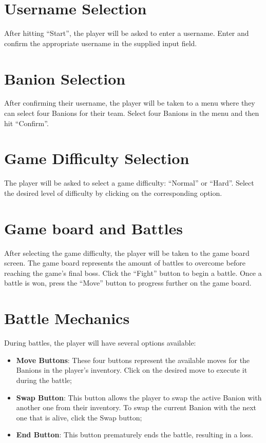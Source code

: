 \documentclass[12pt, a4paper]{report}
\theoremstyle{definition}
\begin{document}
\section{Username Selection}
After hitting ``Start'', the player will be asked to enter a username. Enter and confirm the appropriate username in the supplied input field.

\section{Banion Selection}
After confirming their username, the player will be taken to a menu where they can select four Banions for their team.
Select four Banions in the menu and then hit ``Confirm''.

\section{Game Difficulty Selection}
The player will be asked to select a game difficulty: ``Normal'' or ``Hard''. Select the desired level of difficulty by clicking on the corresponding option.

\section{Game board and Battles}
After selecting the game difficulty, the player will be taken to the game board screen. The game board represents the amount of battles to overcome before reaching the game's final boss.
Click the ``Fight'' button to begin a battle. Once a battle is won, press the ``Move'' button to progress further on the game board.

\section{Battle Mechanics}
During battles, the player will have several options available:
\begin{itemize}
  \item \textbf{Move Buttons}: These four buttons represent the available moves for the Banions in the player's inventory. Click on the desired move to execute it during the battle;
  \item \textbf{Swap Button}: This button allows the player to swap the active Banion with another one from their inventory. To swap the current Banion with the next one that is alive, click the Swap button;
  \item \textbf{End Button}: This button prematurely ends the battle, resulting in a loss.
\end{itemize}
\end{document}
